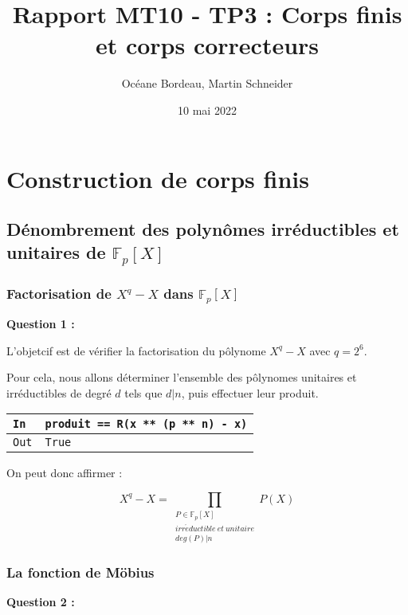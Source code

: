 \documentclass[titlepage]{article}
\title{Rapport MT10 - TP3 : Corps finis et corps correcteurs}
\author{Océane Bordeau, Martin Schneider}
\date{10 mai 2022}
\begin{document}
    \maketitle
    \tableofcontents
    \pagebreak

    \section{Construction de corps finis}
        \setcounter{subsection}{2}
        \subsection{Dénombrement des polynômes irréductibles et unitaires \newline 
        de $\mathbb{F}_p[X]$}
            \subsubsection{Factorisation de $X^q-X$ dans $\mathbb{F}_p[X]$}
            \textbf{Question 1 :}

            L'objetcif est de vérifier la factorisation du pôlynome $X^q-X$ avec $q=2^6$.

            Pour cela, nous allons déterminer l'ensemble des pôlynomes unitaires et 
            irréductibles de degré $d$ tels que $d|n$, puis effectuer leur produit.

            

            \begin{tabularx}{12cm}{|p{0.60cm}|X|}
                \hline
                \rowcolor{gray}
                \texttt{In}
                & 
                \texttt{produit == R(x ** (p ** n) - x)}
                \\
                \hline
                \texttt{Out}
                &
                \texttt{True}
                \\
                \hline
            \end{tabularx}
            \bigbreak

            On peut donc affirmer :

            \[ X^q-X=\prod_{\substack{P \in \mathbb{F}_p[X] \\ irr\acute{e}ductible \: et \: unitaire  \\ deg(P)|n}} P(X) \]

            \subsubsection{La fonction de Möbius}
            \textbf{Question 2 :}
\end{document}
